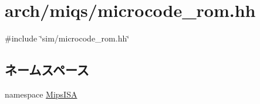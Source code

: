\hypertarget{arch_2miqs_2microcode__rom_8hh}{
\section{arch/miqs/microcode\_\-rom.hh}
\label{arch_2miqs_2microcode__rom_8hh}
}
{\ttfamily \#include \char`\"{}sim/microcode\_\-rom.hh\char`\"{}}\par
\subsection*{ネームスペース}
\begin{DoxyCompactItemize}
\item 
namespace \hyperlink{namespaceMipsISA}{MipsISA}
\end{DoxyCompactItemize}
